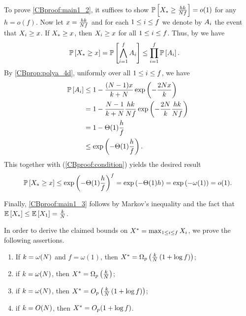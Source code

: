 To prove \ref{CBproof:main1_2}, it suffices to show $\mathbb{P}\left[{X_*}\geq \frac{hk}{N f}\right] =o(1)$ for any $h=o\left(f\right)$. Now let 
$x= \frac{hk}{N f}$ and for each $1\leq i \leq f$ we denote by $A_i$ the event that $X_i\geq x$. If ${X_*} \geq x$, then $X_i \geq x$ for all $1\leq i \leq f$. Thus, by  we have
\begin{align}\label{CBproof:condition}
\mathbb{P}\left[{X_*}\geq x\right]&= \mathbb{P}\left[\bigwedge_{i=1}^{f} A_i\right]\leq \prod_{i=1}^{f}\mathbb{P}\left[A_i\right]. 
\end{align}
By \ref{CBprop:polya_4d}, 
uniformly over all $1\leq i \leq f$, we have
\begin{align*}
\mathbb{P}\left[A_i\right]
&\leq 1-\frac{(N-1) x}{k+N}\exp\left(-\frac{2N x}{k}\right)\\
&=1-\frac{N-1}{k+N}\frac{hk}{N f}\exp\left(-\frac{2N }{k}\frac{hk}{N f}\right)
\\
&= 1-\Theta(1)\frac{h}{f} 
\\
&\leq \exp\left(-\Theta(1)\frac{h}{f}\right).
\end{align*}
This together with (\ref{CBproof:condition}) yields the desired result
\begin{align*}
\mathbb{P}\left[{X_*}\geq x\right]\leq \exp\left(-\Theta(1)\frac{h}{f}\right)^f = \exp\left(-\Theta(1) h \right) = \exp\left(-\omega(1)\right) =o(1).
\end{align*}

Finally, \ref{CBproof:main1_3} follows by Markov's inequality and the fact that $\mathbb{E}\left[{X_*}\right]\leq\mathbb{E}\left[X_1\right]=\frac{k}{N}$.

\bigskip
In order to derive the claimed bounds on ${X^*}=\max_{1\leq i \leq f}X_i$, we prove the following assertions.
\begin{enumerate}[label={(\alph*)}]\addtocounter{enumi}{3}
	\item \label{CBproof:main1_5}
	If $k=\omega(N)$ and $f=\omega(1)$, then ${X^*}=\Omega_p\left(\frac{k}{N}\left(1+\log f\right)\right)$;
	\item \label{CBproof:main1_6}
	if $k=\omega(N)$, then ${X^*}=\Omega_p\left(\frac{k}{N}\right)$;
	\item \label{CBproof:main1_4}
	if $k=\omega(N)$, then ${X^*}=O_p\left(\frac{k}{N}\left(1+\log f\right)\right)$;
	\item \label{CBproof:main1_7}
	if $k=O(N)$, then ${X^*}=O_p(1+\log f)$.
\end{enumerate}

